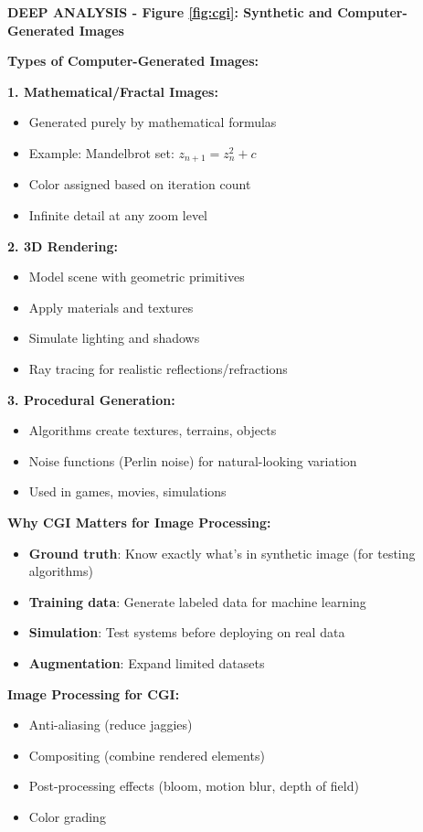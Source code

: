 \documentclass[12pt,a4paper]{article}
\begin{document}
\begin{deepexplanation}
\textbf{DEEP ANALYSIS - Figure \ref{fig:cgi}: Synthetic and Computer-Generated Images}

\textbf{Types of Computer-Generated Images:}

\textbf{1. Mathematical/Fractal Images:}
\begin{itemize}
    \item Generated purely by mathematical formulas
    \item Example: Mandelbrot set: $z_{n+1} = z_n^2 + c$
    \item Color assigned based on iteration count
    \item Infinite detail at any zoom level
\end{itemize}

\textbf{2. 3D Rendering:}
\begin{itemize}
    \item Model scene with geometric primitives
    \item Apply materials and textures
    \item Simulate lighting and shadows
    \item Ray tracing for realistic reflections/refractions
\end{itemize}

\textbf{3. Procedural Generation:}
\begin{itemize}
    \item Algorithms create textures, terrains, objects
    \item Noise functions (Perlin noise) for natural-looking variation
    \item Used in games, movies, simulations
\end{itemize}

\textbf{Why CGI Matters for Image Processing:}
\begin{itemize}
    \item \textbf{Ground truth}: Know exactly what's in synthetic image (for testing algorithms)
    \item \textbf{Training data}: Generate labeled data for machine learning
    \item \textbf{Simulation}: Test systems before deploying on real data
    \item \textbf{Augmentation}: Expand limited datasets
\end{itemize}

\textbf{Image Processing for CGI:}
\begin{itemize}
    \item Anti-aliasing (reduce jaggies)
    \item Compositing (combine rendered elements)
    \item Post-processing effects (bloom, motion blur, depth of field)
    \item Color grading
\end{itemize}
\end{deepexplanation}
\end{document}
